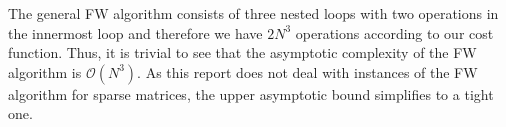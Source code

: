 The general FW algorithm consists of three nested loops with two operations in the
innermost loop and therefore we have $2N^3$ operations according to our cost function.
Thus, it is trivial to see that the asymptotic complexity of the FW
algorithm is $\mathcal{O}(N^3)$. As this report does not deal with instances of the FW
algorithm for sparse matrices, the upper asymptotic bound simplifies to a tight one.
